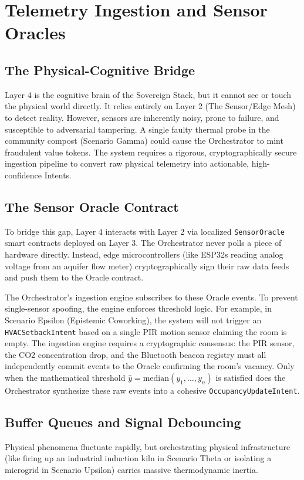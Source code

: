 \chapter{Telemetry Ingestion and Sensor Oracles}

\section{The Physical-Cognitive Bridge}
Layer 4 is the cognitive brain of the Sovereign Stack, but it cannot see or touch the physical world directly. It relies entirely on Layer 2 (The Sensor/Edge Mesh) to detect reality. However, sensors are inherently noisy, prone to failure, and susceptible to adversarial tampering. A single faulty thermal probe in the community compost (Scenario Gamma) could cause the Orchestrator to mint fraudulent value tokens. The system requires a rigorous, cryptographically secure ingestion pipeline to convert raw physical telemetry into actionable, high-confidence Intents.

\section{The Sensor Oracle Contract}
To bridge this gap, Layer 4 interacts with Layer 2 via localized \texttt{SensorOracle} smart contracts deployed on Layer 3. The Orchestrator never polls a piece of hardware directly. Instead, edge microcontrollers (like ESP32s reading analog voltage from an aquifer flow meter) cryptographically sign their raw data feeds and push them to the Oracle contract.

The Orchestrator's ingestion engine subscribes to these Oracle events. To prevent single-sensor spoofing, the engine enforces threshold logic. For example, in Scenario Epsilon (Epistemic Coworking), the system will not trigger an \texttt{HVACSetbackIntent} based on a single PIR motion sensor claiming the room is empty. The ingestion engine requires a cryptographic consensus: the PIR sensor, the CO2 concentration drop, and the Bluetooth beacon registry must all independently commit events to the Oracle confirming the room's vacancy. Only when the mathematical threshold $\hat{y} = \text{median}(y_1, \dots, y_n)$ is satisfied does the Orchestrator synthesize these raw events into a cohesive \texttt{OccupancyUpdateIntent}.

\section{Buffer Queues and Signal Debouncing}
Physical phenomena fluctuate rapidly, but orchestrating physical infrastructure (like firing up an industrial induction kiln in Scenario Theta or isolating a microgrid in Scenario Upsilon) carries massive thermodynamic inertia. 

